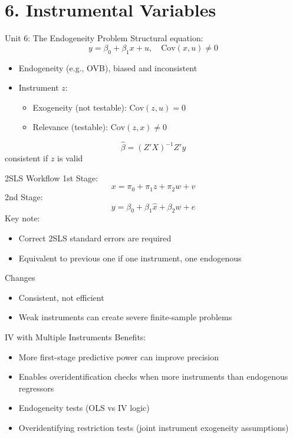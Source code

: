 \documentclass[aspectratio=169]{beamer}
\begin{document}
\section{6. Instrumental Variables}

\begin{frame}{Unit 6: The Endogeneity Problem}
Structural equation:
\[
y = \beta_0 + \beta_1 x + u, \quad \mathrm{Cov}(x,u)\neq 0
\]
\begin{itemize}
	\item Endogeneity (e.g., OVB), biased and inconsistent
	\item Instrument $z$:
\begin{itemize}
	\item Exogeneity (not testable): $\mathrm{Cov}(z,u)=0$
	\item Relevance (testable): $\mathrm{Cov}(z,x)\neq 0$
\end{itemize}
\end{itemize}
$$ \hat \beta = (Z'X)^{-1}Z'y $$ consistent if $z$ is valid
\end{frame}


\begin{frame}{2SLS Workflow}
1st Stage:
\[
x = \pi_0 + \pi_1 z + \pi_2 w + v
\]
2nd Stage:
\[
y = \beta_0 + \beta_1 \hat x + \beta_2 w + e
\]
Key note:
\begin{itemize}
	\item Correct 2SLS standard errors are required
	\item Equivalent to previous one if one instrument, one endogenous
\end{itemize}
\end{frame}

\begin{frame}{Changes}
\begin{itemize}
	\item Consistent, not efficient
	\item Weak instruments can create severe finite-sample problems
\end{itemize}
\end{frame}

\begin{frame}{IV with Multiple Instruments}
Benefits:
\begin{itemize}
	\item More first-stage predictive power can improve precision
	\item Enables overidentification checks when more instruments than endogenous regressors
	\item Endogeneity tests (OLS vs IV logic)
	\item Overidentifying restriction tests (joint instrument exogeneity assumptions)
\end{itemize}
\end{frame}
\end{document}
